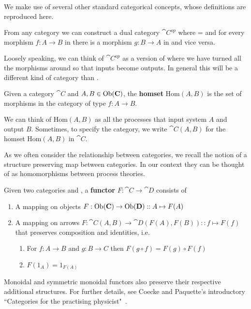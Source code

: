 We make use of several other standard categorical concepts, whose definitions are reproduced here.

\begin{defn}
From any category  we can construct a dual category $\cat{C^{op}}$ where  =  and for every morphism $f:A\to B$ in  there is a morphism $g:B\to A$ in  and vice versa.
\end{defn}

Loosely speaking, we can think of $\cat{C^{op}}$ as a version of  where we have turned all the morphisms around so that inputs become outputs. In general this will be a different kind of category than .

\begin{defn}
Given a category $\cat{C}$ and $A,B\in\mbox{Ob}(\mathbf{C})$, the \textbf{homset} Hom$(A,B)$ is the set of morphisms in the category of type $f:A\to B$.
\end{defn}

We can think of Hom$(A,B)$ as all the processes that input system $A$ and output $B$. Sometimes, to specify the category, we write $\cat{C}(A,B)$ for the homset Hom$(A,B)$ in $\cat{C}$.

As we often consider the relationship between categories, we recall the notion of a structure preserving map between categories. In our context they can be thought of as homomorphisms between process theories.

\begin{defn}
Given two categories  and , a \textbf{functor} $F:\cat{C}\to\cat{D}$ consists of
\begin{enumerate}
\item A mapping on objects $F:\mbox{Ob}(\mathbf{C})\to\mbox{Ob}(\mathbf{D})::A\mapsto F(A)$
\item A mapping on arrows $F:\cat{C}(A,B)\to\cat{D}(F(A),F(B))::f\mapsto F(f)$ that preserves composition and identities, i.e. 
\begin{enumerate}
\item For $f:A\to B$ and $g:B\to C$ then $F(g\circ f) = F(g)\circ F(f)$
\item $F(1_A)=1_{F(A)}$
\end{enumerate}
\end{enumerate}
\end{defn}

\noindent Monoidal and symmetric monoidal functors also preserve their respective additional structures. For further details, see Coecke and Paquette's introductory ``Categories for the practising physicist"~\cite{coecke2011categories}.

